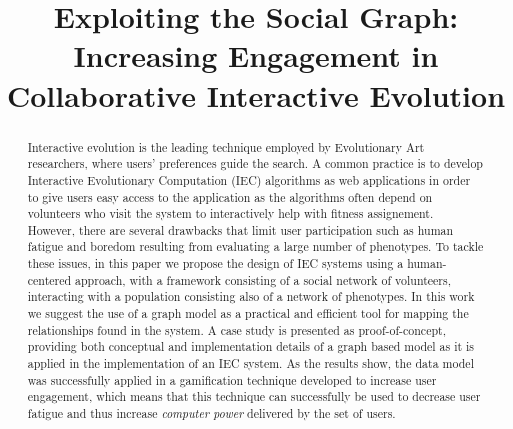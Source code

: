 \documentclass[conference]{IEEEtran}
\begin{document}

\title{Exploiting the Social Graph: Increasing Engagement in Collaborative Interactive Evolution}

\author{
\and
{}
\and
{}
}

\maketitle


\begin{abstract}
Interactive evolution is the leading technique employed by 
Evolutionary Art researchers, where users' preferences guide the search. A common
practice is to develop Interactive Evolutionary Computation (IEC) algorithms
as web applications in order to give users easy access to the
application as the algorithms 
often depend on volunteers who visit the system to interactively help with fitness assignement. 
However, there are several drawbacks that limit user participation 
such as human fatigue and boredom resulting from evaluating 
a large number of phenotypes. 
To tackle these issues, in this paper we propose the design of IEC systems using a human-centered 
approach, with a framework consisting of a social network of 
volunteers, interacting with a population consisting also of a network 
of phenotypes. In this work we suggest the use of a graph model as a practical 
and efficient tool for mapping the relationships 
found in the system. A case study is presented as proof-of-concept, 
providing both conceptual and implementation details of a graph based model 
as it is  applied in the implementation of an IEC system. 
As the results show, the data model was successfully applied in a gamification technique 
developed to increase user engagement, which means that this technique can successfully be used to
decrease user fatigue and thus increase {\em computer power}
delivered by the set of users.
\end{abstract}
\end{document}
